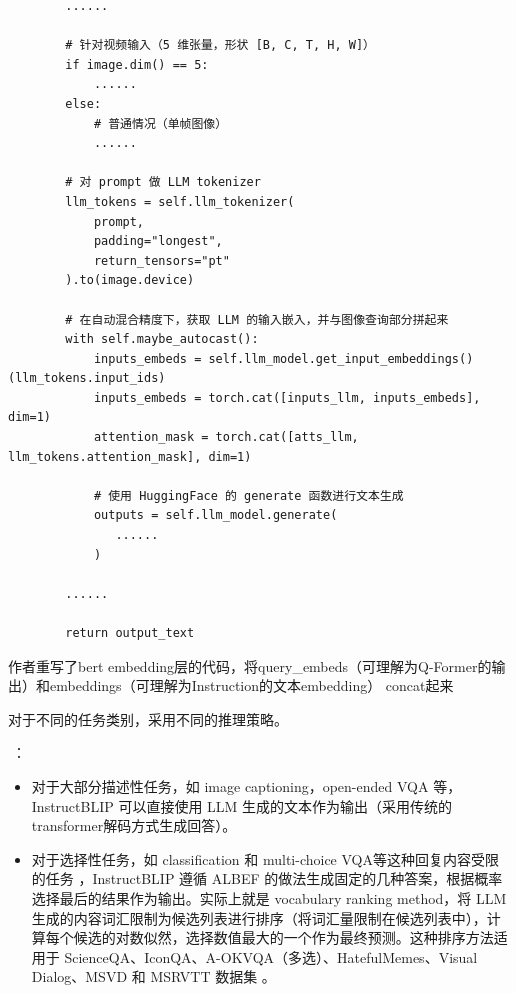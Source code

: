 \documentclass[zihao=false,fontset=windows]{ctexart}
\newcommand{\feiEmoji}[1]{{\emojifont #1}}
\begin{document}
\begin{feishucode}
\begin{lstlisting}
        ......
        
        # 针对视频输入（5 维张量，形状 [B, C, T, H, W]）
        if image.dim() == 5:
            ......
        else:
            # 普通情况（单帧图像）
            ......

        # 对 prompt 做 LLM tokenizer
        llm_tokens = self.llm_tokenizer(
            prompt,
            padding="longest",
            return_tensors="pt"
        ).to(image.device)

        # 在自动混合精度下，获取 LLM 的输入嵌入，并与图像查询部分拼起来
        with self.maybe_autocast():
            inputs_embeds = self.llm_model.get_input_embeddings()(llm_tokens.input_ids)
            inputs_embeds = torch.cat([inputs_llm, inputs_embeds], dim=1)
            attention_mask = torch.cat([atts_llm, llm_tokens.attention_mask], dim=1)

            # 使用 HuggingFace 的 generate 函数进行文本生成
            outputs = self.llm_model.generate(
               ......
            )

        ......

        return output_text
\end{lstlisting}
\end{feishucode}
作者重写了bert embedding层的代码，将query\_embeds（可理解为Q-Former的输出）和embeddings（可理解为Instruction的文本embedding） concat起来\par



\par\vspace{1.15em}\par\vspace{0.28em}
对于不同的任务类别，采用不同的推理策略。\par

\feiEmoji{🌰}：\par

\begin{itemize}
\item 对于大部分描述性任务，如 image captioning，open-ended VQA 等，InstructBLIP 可以直接使用 LLM 生成的文本作为输出（\textcolor{feishuBlue}{采用传统的transformer解码方式生成回答}）。

\item 对于选择性任务，如 classification 和 multi-choice VQA等这种回复内容受限的任务 ，InstructBLIP 遵循 ALBEF 的做法生成固定的几种答案，根据概率选择最后的结果作为输出。实际上就是 vocabulary ranking method，将 LLM 生成的内容词汇限制为候选列表进行排序（\textcolor{feishuBlue}{将词汇量限制在候选列表中}），计算每个候选的对数似然，选择数值最大的一个作为最终预测。这种排序方法适用于 ScienceQA、IconQA、A-OKVQA（多选）、HatefulMemes、Visual Dialog、MSVD 和 MSRVTT 数据集 。

\end{itemize}
\end{document}
